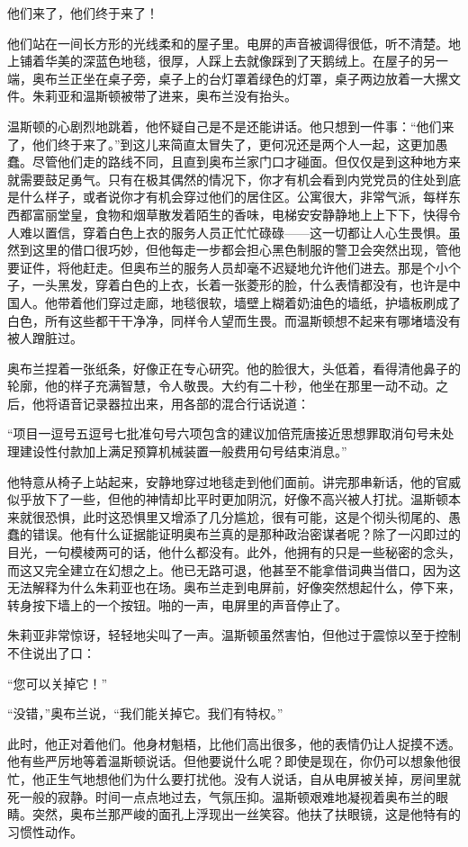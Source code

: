 他们来了，他们终于来了！

他们站在一间长方形的光线柔和的屋子里。电屏的声音被调得很低，听不清楚。地上铺着华美的深蓝色地毯，很厚，人踩上去就像踩到了天鹅绒上。在屋子的另一端，奥布兰正坐在桌子旁，桌子上的台灯罩着绿色的灯罩，桌子两边放着一大摞文件。朱莉亚和温斯顿被带了进来，奥布兰没有抬头。

温斯顿的心剧烈地跳着，他怀疑自己是不是还能讲话。他只想到一件事：``他们来了，他们终于来了。''到这儿来简直太冒失了，更何况还是两个人一起，这更加愚蠢。尽管他们走的路线不同，且直到奥布兰家门口才碰面。但仅仅是到这种地方来就需要鼓足勇气。只有在极其偶然的情况下，你才有机会看到内党党员的住处到底是什么样子，或者说你才有机会穿过他们的居住区。公寓很大，非常气派，每样东西都富丽堂皇，食物和烟草散发着陌生的香味，电梯安安静静地上上下下，快得令人难以置信，穿着白色上衣的服务人员正忙忙碌碌——这一切都让人心生畏惧。虽然到这里的借口很巧妙，但他每走一步都会担心黑色制服的警卫会突然出现，管他要证件，将他赶走。但奥布兰的服务人员却毫不迟疑地允许他们进去。那是个小个子，一头黑发，穿着白色的上衣，长着一张菱形的脸，什么表情都没有，也许是中国人。他带着他们穿过走廊，地毯很软，墙壁上糊着奶油色的墙纸，护墙板刷成了白色，所有这些都干干净净，同样令人望而生畏。而温斯顿想不起来有哪堵墙没有被人蹭脏过。

奥布兰捏着一张纸条，好像正在专心研究。他的脸很大，头低着，看得清他鼻子的轮廓，他的样子充满智慧，令人敬畏。大约有二十秒，他坐在那里一动不动。之后，他将语音记录器拉出来，用各部的混合行话说道：

``项目一逗号五逗号七批准句号六项包含的建议加倍荒唐接近思想罪取消句号未处理建设性付款加上满足预算机械装置一般费用句号结束消息。''

他特意从椅子上站起来，安静地穿过地毯走到他们面前。讲完那串新话，他的官威似乎放下了一些，但他的神情却比平时更加阴沉，好像不高兴被人打扰。温斯顿本来就很恐惧，此时这恐惧里又增添了几分尴尬，很有可能，这是个彻头彻尾的、愚蠢的错误。他有什么证据能证明奥布兰真的是那种政治密谋者呢？除了一闪即过的目光，一句模棱两可的话，他什么都没有。此外，他拥有的只是一些秘密的念头，而这又完全建立在幻想之上。他已无路可退，他甚至不能拿借词典当借口，因为这无法解释为什么朱莉亚也在场。奥布兰走到电屏前，好像突然想起什么，停下来，转身按下墙上的一个按钮。啪的一声，电屏里的声音停止了。

朱莉亚非常惊讶，轻轻地尖叫了一声。温斯顿虽然害怕，但他过于震惊以至于控制不住说出了口：

``您可以关掉它！''

``没错，''奥布兰说，``我们能关掉它。我们有特权。''

此时，他正对着他们。他身材魁梧，比他们高出很多，他的表情仍让人捉摸不透。他有些严厉地等着温斯顿说话。但他要说什么呢？即使是现在，你仍可以想象他很忙，他正生气地想他们为什么要打扰他。没有人说话，自从电屏被关掉，房间里就死一般的寂静。时间一点点地过去，气氛压抑。温斯顿艰难地凝视着奥布兰的眼睛。突然，奥布兰那严峻的面孔上浮现出一丝笑容。他扶了扶眼镜，这是他特有的习惯性动作。


